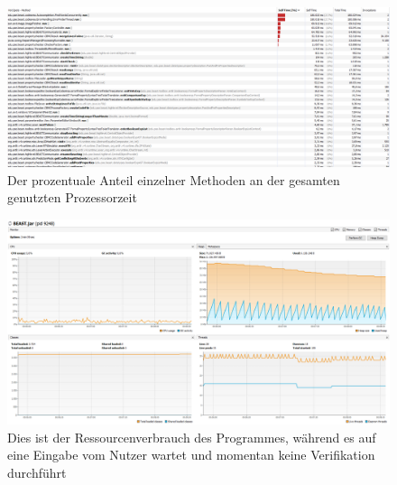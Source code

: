 \documentclass[a4paper]{scrreprt}
\begin{document}
\begin{figure}[ht]
	\centering
  \includegraphics[width=1.0\textheight, 
  height=1.0\textwidth, angle=90]{images/BEAST_PROCESSORTIME.png}
  \caption{Der prozentuale Anteil einzelner Methoden an der gesamten genutzten Prozessorzeit}
	\label{big_procc}
\end{figure} 
\newpage
\begin{figure}[ht]
	\centering
  \includegraphics[width=1.0\textheight, 
  height=1.0\textwidth, angle=90]{images/OLD_NO.png} \caption{Dies ist der
  Ressourcenverbrauch des Programmes, während es auf eine Eingabe vom Nutzer wartet und momentan keine Verifikation durchführt}
	\label{d}
\end{figure}
\end{document}
